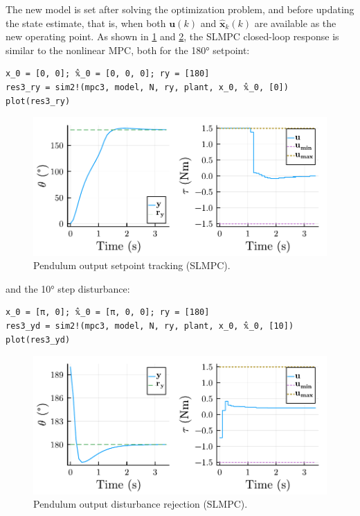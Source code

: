The new model is set after solving the optimization problem, and before updating the state estimate, that is, when both $\mathbf{u}(k)$ and $\mathbf{\hat{x}}_k(k)$ are available as the new operating point. As shown in \cref{fig:plot_SuccLinMPC1} and \ref{fig:plot_SuccLinMPC2}, the SLMPC closed-loop response is similar to the nonlinear MPC, both for the 180° setpoint:
\begin{verbatim}
x_0 = [0, 0]; 𝕩̂_0 = [0, 0, 0]; ry = [180]
res3_ry = sim2!(mpc3, model, N, ry, plant, x_0, 𝕩̂_0, [0])
plot(res3_ry)
\end{verbatim}

\begin{figure}[h]
    \centering
    \includegraphics[width=\columnwidth]{fig/plot_SuccLinMPC1.pdf}
    \caption{Pendulum output setpoint tracking (SLMPC).}\label{fig:plot_SuccLinMPC1}
\end{figure}

\noindent and the 10° step disturbance:
\begin{verbatim}
x_0 = [π, 0]; 𝕩̂_0 = [π, 0, 0]; ry = [180]
res3_yd = sim2!(mpc3, model, N, ry, plant, x_0, 𝕩̂_0, [10])
plot(res3_yd)
\end{verbatim}

\begin{figure}[h]
    \centering
    \includegraphics[width=\columnwidth]{fig/plot_SuccLinMPC2.pdf}
    \caption{Pendulum output disturbance rejection (SLMPC).}\label{fig:plot_SuccLinMPC2}
\end{figure}


